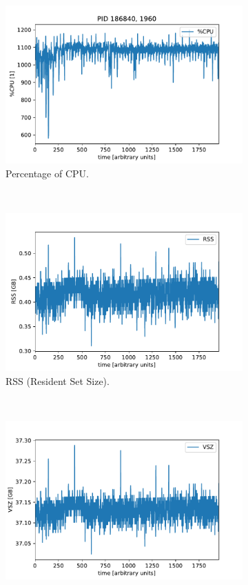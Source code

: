\documentclass[11pt, a4paper, oneside]{article}
\begin{document}
\begin{figure}[h!]
  \begin{subfigure}[b]{0.45 \textwidth}
    \includegraphics[width = \textwidth]{graphics/threefold_morse/threefold_perCPU.pdf}
    \caption{Percentage of CPU.}
  \end{subfigure}
  ~
  \begin{subfigure}[b]{0.45 \textwidth}
    \includegraphics[width = \textwidth]{graphics/threefold_morse/threefold_RSS.pdf}
    \caption{RSS (Resident Set Size).}
  \end{subfigure}
  ~
  \begin{subfigure}[b]{0.45 \textwidth}
    \centering
    \includegraphics[width = \textwidth]{graphics/threefold_morse/threefold_VSZ.pdf}

\end{subfigure}
\end{figure}
\end{document}
